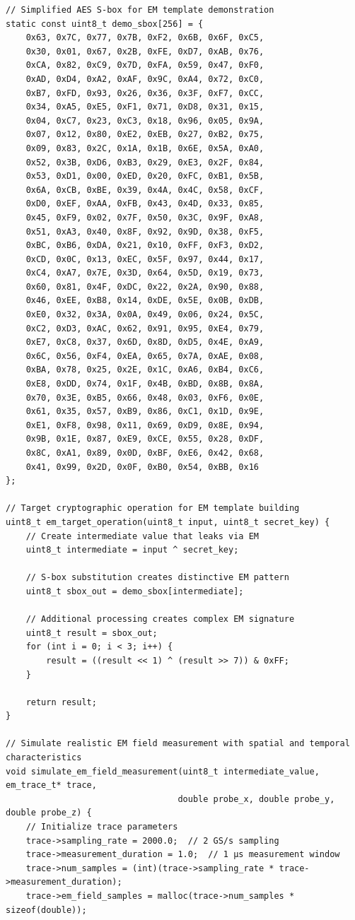 \documentclass[11pt,a4paper]{article}
\theoremstyle{definition}
\begin{document}
\begin{lstlisting}[caption={Complete EM Template Building Implementation}]
// Simplified AES S-box for EM template demonstration
static const uint8_t demo_sbox[256] = {
    0x63, 0x7C, 0x77, 0x7B, 0xF2, 0x6B, 0x6F, 0xC5,
    0x30, 0x01, 0x67, 0x2B, 0xFE, 0xD7, 0xAB, 0x76,
    0xCA, 0x82, 0xC9, 0x7D, 0xFA, 0x59, 0x47, 0xF0,
    0xAD, 0xD4, 0xA2, 0xAF, 0x9C, 0xA4, 0x72, 0xC0,
    0xB7, 0xFD, 0x93, 0x26, 0x36, 0x3F, 0xF7, 0xCC,
    0x34, 0xA5, 0xE5, 0xF1, 0x71, 0xD8, 0x31, 0x15,
    0x04, 0xC7, 0x23, 0xC3, 0x18, 0x96, 0x05, 0x9A,
    0x07, 0x12, 0x80, 0xE2, 0xEB, 0x27, 0xB2, 0x75,
    0x09, 0x83, 0x2C, 0x1A, 0x1B, 0x6E, 0x5A, 0xA0,
    0x52, 0x3B, 0xD6, 0xB3, 0x29, 0xE3, 0x2F, 0x84,
    0x53, 0xD1, 0x00, 0xED, 0x20, 0xFC, 0xB1, 0x5B,
    0x6A, 0xCB, 0xBE, 0x39, 0x4A, 0x4C, 0x58, 0xCF,
    0xD0, 0xEF, 0xAA, 0xFB, 0x43, 0x4D, 0x33, 0x85,
    0x45, 0xF9, 0x02, 0x7F, 0x50, 0x3C, 0x9F, 0xA8,
    0x51, 0xA3, 0x40, 0x8F, 0x92, 0x9D, 0x38, 0xF5,
    0xBC, 0xB6, 0xDA, 0x21, 0x10, 0xFF, 0xF3, 0xD2,
    0xCD, 0x0C, 0x13, 0xEC, 0x5F, 0x97, 0x44, 0x17,
    0xC4, 0xA7, 0x7E, 0x3D, 0x64, 0x5D, 0x19, 0x73,
    0x60, 0x81, 0x4F, 0xDC, 0x22, 0x2A, 0x90, 0x88,
    0x46, 0xEE, 0xB8, 0x14, 0xDE, 0x5E, 0x0B, 0xDB,
    0xE0, 0x32, 0x3A, 0x0A, 0x49, 0x06, 0x24, 0x5C,
    0xC2, 0xD3, 0xAC, 0x62, 0x91, 0x95, 0xE4, 0x79,
    0xE7, 0xC8, 0x37, 0x6D, 0x8D, 0xD5, 0x4E, 0xA9,
    0x6C, 0x56, 0xF4, 0xEA, 0x65, 0x7A, 0xAE, 0x08,
    0xBA, 0x78, 0x25, 0x2E, 0x1C, 0xA6, 0xB4, 0xC6,
    0xE8, 0xDD, 0x74, 0x1F, 0x4B, 0xBD, 0x8B, 0x8A,
    0x70, 0x3E, 0xB5, 0x66, 0x48, 0x03, 0xF6, 0x0E,
    0x61, 0x35, 0x57, 0xB9, 0x86, 0xC1, 0x1D, 0x9E,
    0xE1, 0xF8, 0x98, 0x11, 0x69, 0xD9, 0x8E, 0x94,
    0x9B, 0x1E, 0x87, 0xE9, 0xCE, 0x55, 0x28, 0xDF,
    0x8C, 0xA1, 0x89, 0x0D, 0xBF, 0xE6, 0x42, 0x68,
    0x41, 0x99, 0x2D, 0x0F, 0xB0, 0x54, 0xBB, 0x16
};

// Target cryptographic operation for EM template building
uint8_t em_target_operation(uint8_t input, uint8_t secret_key) {
    // Create intermediate value that leaks via EM
    uint8_t intermediate = input ^ secret_key;
    
    // S-box substitution creates distinctive EM pattern
    uint8_t sbox_out = demo_sbox[intermediate];
    
    // Additional processing creates complex EM signature
    uint8_t result = sbox_out;
    for (int i = 0; i < 3; i++) {
        result = ((result << 1) ^ (result >> 7)) & 0xFF;
    }
    
    return result;
}

// Simulate realistic EM field measurement with spatial and temporal characteristics
void simulate_em_field_measurement(uint8_t intermediate_value, em_trace_t* trace,
                                  double probe_x, double probe_y, double probe_z) {
    // Initialize trace parameters
    trace->sampling_rate = 2000.0;  // 2 GS/s sampling
    trace->measurement_duration = 1.0;  // 1 μs measurement window
    trace->num_samples = (int)(trace->sampling_rate * trace->measurement_duration);
    trace->em_field_samples = malloc(trace->num_samples * sizeof(double));
    

\end{lstlisting}
\end{document}
